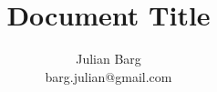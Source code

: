 \documentclass[12pt, man, natbib]{apa6}
\title{Document Title}
\author{Julian Barg\\barg.julian@gmail.com}
\affiliation{Ivey Business School}
\begin{document}
	
	\maketitle
	
	\singlespacing
	
	\section{}	


\end{document}
